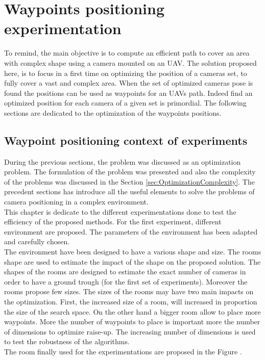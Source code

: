 \chapter{Waypoints positioning experimentation} \label{chap:waypointPoseExp}
\minitoc
To remind, the main objective is to compute  an efficient path to cover an area with complex shape using a camera mounted on an UAV. The solution proposed here, is to focus in a first time on optimizing the position of a cameras set, to fully cover a vast and complex area. When the set of optimized cameras pose is found the positions can be used as waypoints for an UAVs path. Indeed find an optimized position for each camera of a given set is primordial. The following sections are dedicated to the optimization of the waypoints positions. 







\section{Waypoint positioning context of experiments} \label{sec:contextOfExp}

 During the previous sections, the problem was discussed as an optimization problem. The formulation of the problem was presented and also the complexity of the problems was discussed in the Section \ref{sec:OptimizationComplexity}. 
The precedent sections has introduce all the useful elements to solve the problems of camera positioning in a complex environment. \\
This chapter is dedicate to the different experimentations done to test the efficiency of the proposed methods. 
For the first experiment, different environment are proposed. The parameters of the environment has been adapted and carefully chosen. \\
The environment have been designed to have a various shape and size. The rooms shape are used to estimate the impact of the shape on the proposed solution.
The shapes of the rooms are designed to estimate the exact number of cameras in order to have a ground trough (for the first set of experiments).
Moreover the rooms propose few sizes. The sizes of the rooms may have two main impacts on the optimization.
First, the increased  size of a room, will increased in proportion the size of the search space. On the other hand a bigger room allow to place more waypoints. More the number of waypoints to place is important more the number of dimensions to optimize raise-up. The increasing number of dimensions is used to test the robustness of the algorithms.\\
 The room finally used for the experimentations are proposed in the Figure .

